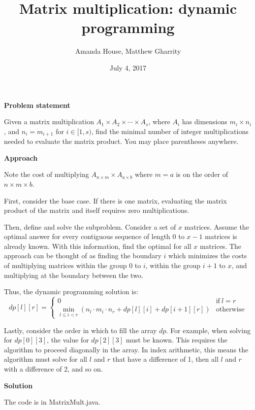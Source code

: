 \documentclass[12pt]{article}
\title{Matrix multiplication: dynamic programming}
\author{Amanda House, Matthew Gharrity}
\date{July 4, 2017}
\begin{document}
\maketitle

\textbf{Problem statement}

Given a matrix multiplication $A_1 \times A_2 \times \cdots \times A_s$,
where $A_i$ has dimensions $m_i \times n_i$,
and $n_i = m_{i +1}$
for $i \in [1, s)$,
find the minimal number of integer multiplications needed to evaluate the matrix product. You may place parentheses anywhere.

\textbf{Approach}

Note the cost of multiplying $A_{n \times m} \times A_{a \times b}$
where $m = a$
is on the order of $n \times m \times b$.

First, consider the base case. If there is one matrix, evaluating the matrix product of the matrix and itself requires zero multiplications.

Then, define and solve the subproblem. Consider a set of $x$ matrices. Assume the optimal answer for every contiguous sequence of length 0 to $x-1$ matrices is already known. With this information, find the optimal for all $x$ matrices. The approach can be thought of as finding the boundary $i$ which minimizes the costs of multiplying matrices within the group 0 to $i$, within the group $i+1$ to $x$, and multiplying at the boundary between the two.

Thus, the dynamic programming solution is:
\[
  dp[l][r]=
    \begin{cases}
      0 & \text{if}\ l=r \\
      \min\limits_{l \leq i < r} (n_l \cdot m_i \cdot n_r + dp[l][i] + dp[i+1][r]) & \text{otherwise}
    \end{cases}
\]

Lastly, consider the order in which to fill the array $dp$. For example, when solving for $dp[0][3]$, the value for $dp[2][3]$ must be known. This requires the algorithm to proceed diagonally in the array. In index arithmetic, this means the algorithm must solve for all $l$ and $r$ that have a difference of 1, then all $l$ and $r$ with a difference of 2, and so on.

\textbf{Solution}

The code is in MatrixMult.java.
\end{document}
